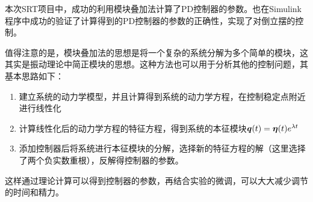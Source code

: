 \documentclass[UTF8]{ctexart}
\begin{document}
本次SRT项目中，成功的利用模块叠加法计算了PD控制器的参数。也在Simulink程序中成功的验证了计算得到的PD控制器的参数的正确性，实现了对倒立摆的控制。

值得注意的是，模块叠加法的思想是将一个复杂的系统分解为多个简单的模块，这其实是振动理论中简正模块的思想。这种方法也可以用于分析其他的控制问题，其基本思路如下：

\begin{enumerate}
    \item 建立系统的动力学模型，并且计算得到系统的动力学方程，在控制稳定点附近进行线性化
    \item 计算线性化后的动力学方程的特征方程，得到系统的本征模块$\boldsymbol{q}(t)=\boldsymbol{\eta}(t)e^{\lambda t}$
    \item 添加控制器后将系统进行本征模块的分解，选择新的特征方程的解（这里选择了两个负实数重根），反解得控制器的参数。
\end{enumerate}

这样通过理论计算可以得到控制器的参数，再结合实验的微调，可以大大减少调节的时间和精力。
\end{document}
